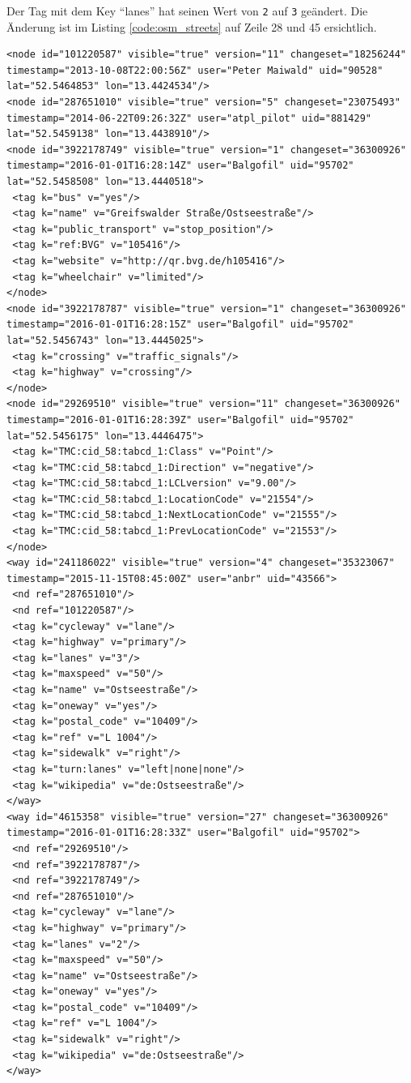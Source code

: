 Der Tag mit dem Key ``lanes'' hat seinen Wert von \texttt{2} auf \texttt{3} geändert. Die Änderung ist im Listing \ref{code:osm_streets} auf Zeile 28 und 45 ersichtlich.
\lstset{
  numbers=left,
  numbersep=5pt,
  caption=Vollständige Daten des Straßenabschnitts,
  label=code:osm_streets
}
\begin{lstlisting}
<node id="101220587" visible="true" version="11" changeset="18256244" timestamp="2013-10-08T22:00:56Z" user="Peter Maiwald" uid="90528" lat="52.5464853" lon="13.4424534"/>
<node id="287651010" visible="true" version="5" changeset="23075493" timestamp="2014-06-22T09:26:32Z" user="atpl_pilot" uid="881429" lat="52.5459138" lon="13.4438910"/>
<node id="3922178749" visible="true" version="1" changeset="36300926" timestamp="2016-01-01T16:28:14Z" user="Balgofil" uid="95702" lat="52.5458508" lon="13.4440518">
 <tag k="bus" v="yes"/>
 <tag k="name" v="Greifswalder Straße/Ostseestraße"/>
 <tag k="public_transport" v="stop_position"/>
 <tag k="ref:BVG" v="105416"/>
 <tag k="website" v="http://qr.bvg.de/h105416"/>
 <tag k="wheelchair" v="limited"/>
</node>
<node id="3922178787" visible="true" version="1" changeset="36300926" timestamp="2016-01-01T16:28:15Z" user="Balgofil" uid="95702" lat="52.5456743" lon="13.4445025">
 <tag k="crossing" v="traffic_signals"/>
 <tag k="highway" v="crossing"/>
</node>
<node id="29269510" visible="true" version="11" changeset="36300926" timestamp="2016-01-01T16:28:39Z" user="Balgofil" uid="95702" lat="52.5456175" lon="13.4446475">
 <tag k="TMC:cid_58:tabcd_1:Class" v="Point"/>
 <tag k="TMC:cid_58:tabcd_1:Direction" v="negative"/>
 <tag k="TMC:cid_58:tabcd_1:LCLversion" v="9.00"/>
 <tag k="TMC:cid_58:tabcd_1:LocationCode" v="21554"/>
 <tag k="TMC:cid_58:tabcd_1:NextLocationCode" v="21555"/>
 <tag k="TMC:cid_58:tabcd_1:PrevLocationCode" v="21553"/>
</node>
<way id="241186022" visible="true" version="4" changeset="35323067" timestamp="2015-11-15T08:45:00Z" user="anbr" uid="43566">
 <nd ref="287651010"/>
 <nd ref="101220587"/>
 <tag k="cycleway" v="lane"/>
 <tag k="highway" v="primary"/>
 <tag k="lanes" v="3"/>
 <tag k="maxspeed" v="50"/>
 <tag k="name" v="Ostseestraße"/>
 <tag k="oneway" v="yes"/>
 <tag k="postal_code" v="10409"/>
 <tag k="ref" v="L 1004"/>
 <tag k="sidewalk" v="right"/>
 <tag k="turn:lanes" v="left|none|none"/>
 <tag k="wikipedia" v="de:Ostseestraße"/>
</way>
<way id="4615358" visible="true" version="27" changeset="36300926" timestamp="2016-01-01T16:28:33Z" user="Balgofil" uid="95702">
 <nd ref="29269510"/>
 <nd ref="3922178787"/>
 <nd ref="3922178749"/>
 <nd ref="287651010"/>
 <tag k="cycleway" v="lane"/>
 <tag k="highway" v="primary"/>
 <tag k="lanes" v="2"/>
 <tag k="maxspeed" v="50"/>
 <tag k="name" v="Ostseestraße"/>
 <tag k="oneway" v="yes"/>
 <tag k="postal_code" v="10409"/>
 <tag k="ref" v="L 1004"/>
 <tag k="sidewalk" v="right"/>
 <tag k="wikipedia" v="de:Ostseestraße"/>
</way>
\end{lstlisting}
\lstset{
  numbers=none,
  caption=,
  label=
  }

